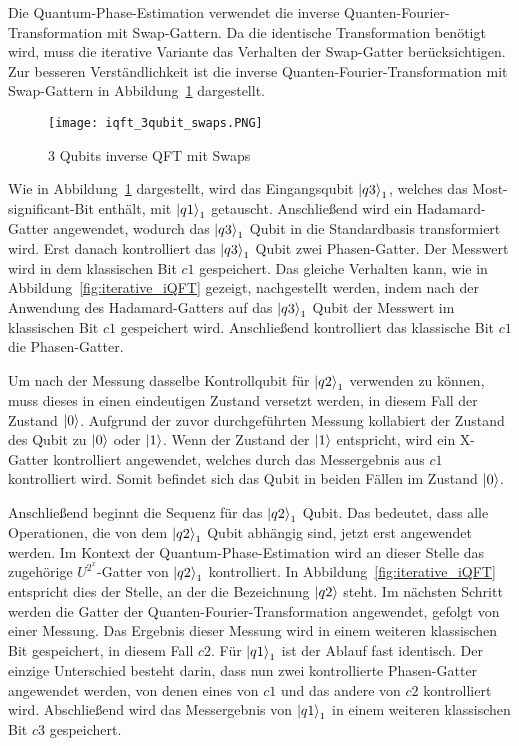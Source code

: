 Die Quantum-Phase-Estimation verwendet die inverse Quanten-Fourier-Transformation mit Swap-Gattern.
Da die identische Transformation benötigt wird, 
muss die iterative Variante das Verhalten der Swap-Gatter berücksichtigen.
Zur besseren Verständlichkeit ist die inverse Quanten-Fourier-Transformation mit Swap-Gattern in Abbildung~\ref{fig:iQFTswaps} dargestellt.
\begin{figure}[H]
  \centering
  \texttt{[image: iqft\_3qubit\_swaps.PNG]}
  \caption{3 Qubits inverse QFT mit Swaps}
  \label{fig:iQFTswaps}
\end{figure}
Wie in Abbildung~\ref{fig:iQFTswaps} dargestellt, 
wird das Eingangsqubit \(\ket{q3}_1\), welches das Most-significant-Bit enthält, 
mit \(\ket{q1}_1\) getauscht. 
Anschließend wird ein Hadamard-Gatter angewendet, 
wodurch das \(\ket{q3}_1\) Qubit in die Standardbasis transformiert wird. 
Erst danach kontrolliert das \(\ket{q3}_1\) Qubit zwei Phasen-Gatter.
Der Messwert wird in dem klassischen Bit \(c1\) gespeichert.
Das gleiche Verhalten kann, wie in Abbildung~\ref{fig:iterative_iQFT} gezeigt, nachgestellt werden, 
indem nach der Anwendung des Hadamard-Gatters auf das \(\ket{q3}_1\) Qubit 
der Messwert im klassischen Bit \(c1\) gespeichert wird.
Anschließend kontrolliert das klassische Bit \(c1\) die Phasen-Gatter.

Um nach der Messung dasselbe Kontrollqubit für \(\ket{q2}_1\) verwenden zu können, 
muss dieses in einen eindeutigen Zustand versetzt werden, 
in diesem Fall der Zustand \(\ket{0}\).
Aufgrund der zuvor durchgeführten Messung 
kollabiert der Zustand des Qubit zu \(\ket{0}\) oder \(\ket{1}\). 
Wenn der Zustand der \(\ket{1}\) entspricht, 
wird ein X-Gatter kontrolliert angewendet, 
welches durch das Messergebnis aus \(c1\) kontrolliert wird. 
Somit befindet sich das Qubit in beiden Fällen im Zustand \(\ket{0}\).

Anschließend beginnt die Sequenz für das \(\ket{q2}_1\) Qubit.
Das bedeutet, dass alle Operationen, die von dem \(\ket{q2}_1\) Qubit abhängig sind, 
jetzt erst angewendet werden.
Im Kontext der Quantum-Phase-Estimation wird an dieser Stelle das zugehörige \(U^{2^x}\)-Gatter von \(\ket{q2}_1\) kontrolliert.
In Abbildung~\ref{fig:iterative_iQFT} entspricht dies der Stelle, an der die Bezeichnung \(\ket{q2}\) steht.
Im nächsten Schritt werden die Gatter der Quanten-Fourier-Transformation angewendet, gefolgt von einer Messung. 
Das Ergebnis dieser Messung wird in einem weiteren klassischen Bit gespeichert, in diesem Fall \(c2\).
Für \(\ket{q1}_1\) ist der Ablauf fast identisch.
Der einzige Unterschied besteht darin, 
dass nun zwei kontrollierte Phasen-Gatter angewendet werden, 
von denen eines von \(c1\) und das andere von \(c2\) kontrolliert wird.
Abschließend wird das Messergebnis von \(\ket{q1}_1\) in einem weiteren klassischen Bit \(c3\) gespeichert.

